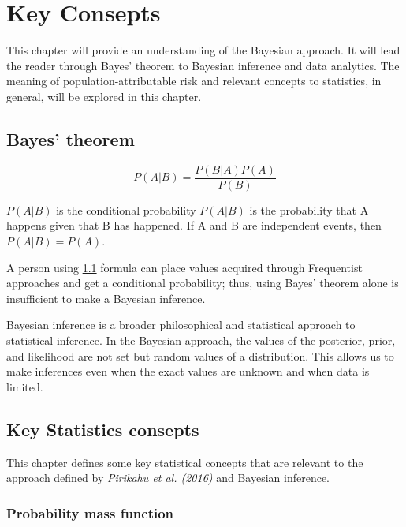 \chapter{Key Consepts} \label{sec:Consepts}

This chapter will provide an understanding of the Bayesian approach. It will lead the reader through Bayes' theorem to Bayesian inference and data analytics. The meaning of population-attributable risk and relevant concepts to statistics, in general, will be explored in this chapter.  

\section{Bayes' theorem}\label{BayesianTheorem}
\begin{equation}
P(A|B) = \frac{P(B|A)P(A)}{P(B)}
\end{equation}

$P(A|B)$ is the conditional probability \cite{Gut2005ProbabilityAG} $P(A|B)$ is the probability that A happens given that B has happened. If A and B are independent events, then $P(A|B) = P(A)$. \cite{Gut2005ProbabilityAG}

A person using \ref{BayesianTheorem} formula can place values acquired through Frequentist approaches and get a conditional probability; thus, using Bayes' theorem alone is insufficient to make a Bayesian inference. 

Bayesian inference is a broader philosophical and statistical approach to statistical inference.\cite{Mcelreath2015StatisticalRA} In the Bayesian approach, the values of the posterior, prior, and likelihood are not set but random values of a distribution.\cite{Gut2005ProbabilityAG} This allows us to make inferences even when the exact values are unknown and when data is limited.

\section{Key Statistics consepts}\label{RelevantConseptsOfStatistics}

This chapter defines some key statistical concepts that are relevant to the approach defined by \textit{Pirikahu et al. (2016)} and Bayesian inference.

\subsection{Probability mass function} \label{PropabilityMassFunction}

